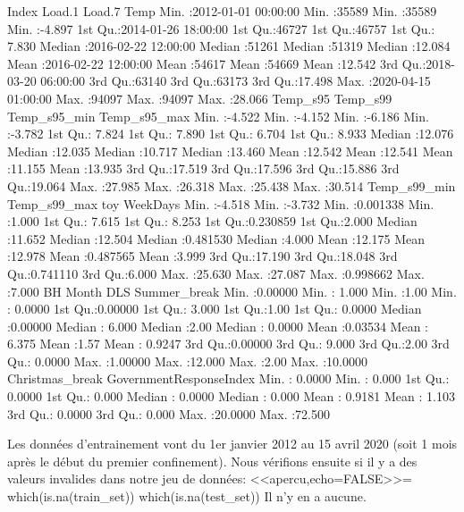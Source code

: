 \documentclass{article}
\begin{document}
\begin{Schunk}
\begin{Soutput}
     Index                         Load.1          Load.7           Temp       
 Min.   :2012-01-01 00:00:00   Min.   :35589   Min.   :35589   Min.   :-4.897  
 1st Qu.:2014-01-26 18:00:00   1st Qu.:46727   1st Qu.:46757   1st Qu.: 7.830  
 Median :2016-02-22 12:00:00   Median :51261   Median :51319   Median :12.084  
 Mean   :2016-02-22 12:00:00   Mean   :54617   Mean   :54669   Mean   :12.542  
 3rd Qu.:2018-03-20 06:00:00   3rd Qu.:63140   3rd Qu.:63173   3rd Qu.:17.498  
 Max.   :2020-04-15 01:00:00   Max.   :94097   Max.   :94097   Max.   :28.066  
    Temp_s95         Temp_s99       Temp_s95_min     Temp_s95_max   
 Min.   :-4.522   Min.   :-4.152   Min.   :-6.186   Min.   :-3.782  
 1st Qu.: 7.824   1st Qu.: 7.890   1st Qu.: 6.704   1st Qu.: 8.933  
 Median :12.076   Median :12.035   Median :10.717   Median :13.460  
 Mean   :12.542   Mean   :12.541   Mean   :11.155   Mean   :13.935  
 3rd Qu.:17.519   3rd Qu.:17.596   3rd Qu.:15.886   3rd Qu.:19.064  
 Max.   :27.985   Max.   :26.318   Max.   :25.438   Max.   :30.514  
  Temp_s99_min     Temp_s99_max         toy              WeekDays    
 Min.   :-4.518   Min.   :-3.732   Min.   :0.001338   Min.   :1.000  
 1st Qu.: 7.615   1st Qu.: 8.253   1st Qu.:0.230859   1st Qu.:2.000  
 Median :11.652   Median :12.504   Median :0.481530   Median :4.000  
 Mean   :12.175   Mean   :12.978   Mean   :0.487565   Mean   :3.999  
 3rd Qu.:17.190   3rd Qu.:18.048   3rd Qu.:0.741110   3rd Qu.:6.000  
 Max.   :25.630   Max.   :27.087   Max.   :0.998662   Max.   :7.000  
       BH              Month             DLS        Summer_break    
 Min.   :0.00000   Min.   : 1.000   Min.   :1.00   Min.   : 0.0000  
 1st Qu.:0.00000   1st Qu.: 3.000   1st Qu.:1.00   1st Qu.: 0.0000  
 Median :0.00000   Median : 6.000   Median :2.00   Median : 0.0000  
 Mean   :0.03534   Mean   : 6.375   Mean   :1.57   Mean   : 0.9247  
 3rd Qu.:0.00000   3rd Qu.: 9.000   3rd Qu.:2.00   3rd Qu.: 0.0000  
 Max.   :1.00000   Max.   :12.000   Max.   :2.00   Max.   :10.0000  
 Christmas_break   GovernmentResponseIndex
 Min.   : 0.0000   Min.   : 0.000         
 1st Qu.: 0.0000   1st Qu.: 0.000         
 Median : 0.0000   Median : 0.000         
 Mean   : 0.9181   Mean   : 1.103         
 3rd Qu.: 0.0000   3rd Qu.: 0.000         
 Max.   :20.0000   Max.   :72.500         
\end{Soutput}
\end{Schunk}
Les données d'entrainement vont du 1er janvier 2012 au 15 avril 2020 (soit 1 mois après le début du premier confinement). 
 Nous vérifions ensuite si il y a des valeurs invalides dans notre jeu de données: 
 <<apercu,echo=FALSE>>=
 which(is.na(train_set))
 which(is.na(test_set))
Il n'y en a aucune.
\end{document}
